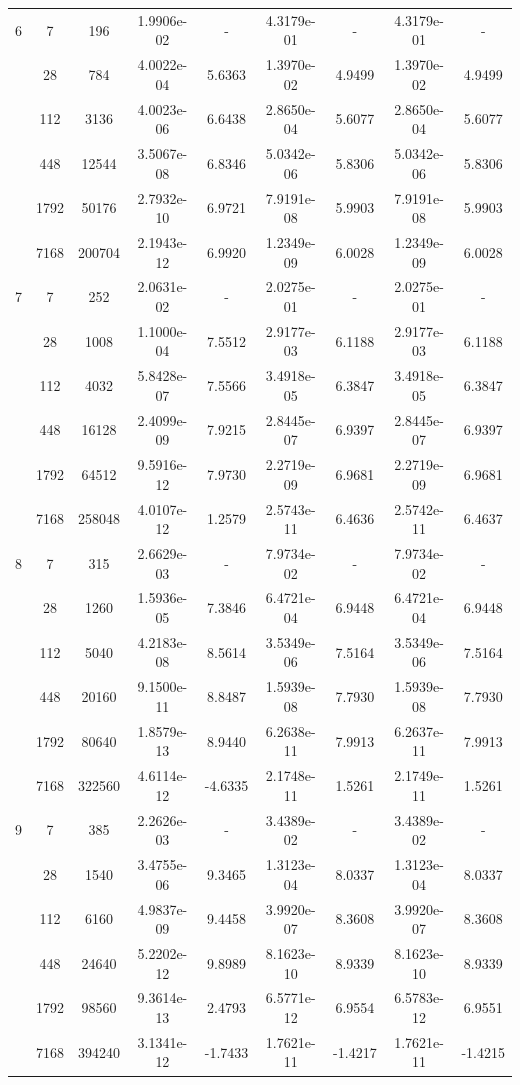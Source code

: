 \begin{longtable}{| c | c c | c c | c c | c c |}
	\hline

	6   & 7 & 196 & 1.9906e-02 & - & 4.3179e-01 & - & 4.3179e-01 & - \\
		& 28 & 784 & 4.0022e-04 & 5.6363 & 1.3970e-02 & 4.9499 & 1.3970e-02 & 4.9499 \\
		& 112 & 3136 & 4.0023e-06 & 6.6438 & 2.8650e-04 & 5.6077 & 2.8650e-04 & 5.6077 \\
		& 448 & 12544 & 3.5067e-08 & 6.8346 & 5.0342e-06 & 5.8306 & 5.0342e-06 & 5.8306 \\
		& 1792 & 50176 & 2.7932e-10 & 6.9721 & 7.9191e-08 & 5.9903 & 7.9191e-08 & 5.9903 \\
		& 7168 & 200704 & 2.1943e-12 & 6.9920 & 1.2349e-09 & 6.0028 & 1.2349e-09 & 6.0028 \\

	\hline

	7	& 7 & 252 & 2.0631e-02 & - & 2.0275e-01 & - & 2.0275e-01 & - \\
		& 28 & 1008 & 1.1000e-04 & 7.5512 & 2.9177e-03 & 6.1188 & 2.9177e-03 & 6.1188 \\
		& 112 & 4032 & 5.8428e-07 & 7.5566 & 3.4918e-05 & 6.3847 & 3.4918e-05 & 6.3847 \\
		& 448 & 16128 & 2.4099e-09 & 7.9215 & 2.8445e-07 & 6.9397 & 2.8445e-07 & 6.9397 \\
		& 1792 & 64512 & 9.5916e-12 & 7.9730 & 2.2719e-09 & 6.9681 & 2.2719e-09 & 6.9681 \\
		& 7168 & 258048 & 4.0107e-12 & 1.2579 & 2.5743e-11 & 6.4636 & 2.5742e-11 & 6.4637 \\

	\hline

	8	& 7 & 315 & 2.6629e-03 & - & 7.9734e-02 & - & 7.9734e-02 & - \\
		& 28 & 1260 & 1.5936e-05 & 7.3846 & 6.4721e-04 & 6.9448 & 6.4721e-04 & 6.9448 \\
		& 112 & 5040 & 4.2183e-08 & 8.5614 & 3.5349e-06 & 7.5164 & 3.5349e-06 & 7.5164 \\
		& 448 & 20160 & 9.1500e-11 & 8.8487 & 1.5939e-08 & 7.7930 & 1.5939e-08 & 7.7930 \\
		& 1792 & 80640 & 1.8579e-13 & 8.9440 & 6.2638e-11 & 7.9913 & 6.2637e-11 & 7.9913 \\
		& 7168 & 322560 & 4.6114e-12 & -4.6335 & 2.1748e-11 & 1.5261 & 2.1749e-11 & 1.5261 \\

	\hline

	9	& 7 & 385 & 2.2626e-03 & - & 3.4389e-02 & - & 3.4389e-02 & - \\
		& 28 & 1540 & 3.4755e-06 & 9.3465 & 1.3123e-04 & 8.0337 & 1.3123e-04 & 8.0337 \\
		& 112 & 6160 & 4.9837e-09 & 9.4458 & 3.9920e-07 & 8.3608 & 3.9920e-07 & 8.3608 \\
		& 448 & 24640 & 5.2202e-12 & 9.8989 & 8.1623e-10 & 8.9339 & 8.1623e-10 & 8.9339 \\
		& 1792 & 98560 & 9.3614e-13 & 2.4793 & 6.5771e-12 & 6.9554 & 6.5783e-12 & 6.9551 \\
		& 7168 & 394240 & 3.1341e-12 & -1.7433 & 1.7621e-11 & -1.4217 & 1.7621e-11 & -1.4215 \\


\end{longtable}
